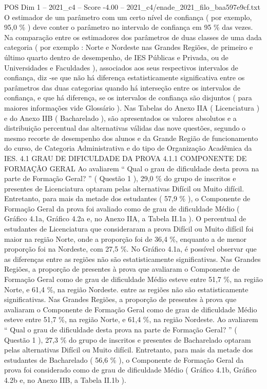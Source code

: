 \begin{textsample}{POS Dim 1 – 2021\_c4 – Score -4.00 – 2021\_c4/enade\_2021\_filo\_baa597e9cf.txt}
O estimador de um parâmetro com um certo nível de confiança ( por exemplo, 95,0 \% ) deve conter o parâmetro no intervalo de confiança em 95 \% das vezes.
Na comparação entre os estimadores dos parâmetros de duas classes de uma dada categoria ( por exemplo : Norte e Nordeste nas Grandes Regiões, de primeiro e último quarto dentro de desempenho, de IES Públicas e Privada, ou de Universidades e Faculdades ), associados aos seus respectivos intervalos de confiança, diz -se que não há diferença estatisticamente significativa entre os parâmetros das duas categorias quando há interseção entre os intervalos de confiança, e que há diferença, se os intervalos de confiança são disjuntos ( para maiores informações vide Glossário ).
Nas Tabelas do Anexo IIA ( Licenciatura ) e do Anexo IIB ( Bacharelado ), são apresentados os valores absolutos e a distribuição percentual das alternativas válidas das nove questões, segundo o mesmo recorte de desempenho dos alunos e da Grande Região de funcionamento do curso, de Categoria Administrativa e do tipo de Organização Acadêmica da IES. 4.1 GRAU DE DIFICULDADE DA PROVA 4.1.1 COMPONENTE DE FORMAÇÃO GERAL Ao avaliarem “ Qual o grau de dificuldade desta prova na parte de Formação Geral? ” ( Questão 1 ), 29,0 \% do grupo de inscritos e presentes de Licenciatura optaram pelas alternativas Difícil ou Muito difícil.
Entretanto, para mais da metade dos estudantes ( 57,9 \% ), o Componente de Formação Geral da prova foi avaliado como de grau de dificuldade Médio ( Gráfico 4.1a, Gráfico 4.2a e, no Anexo IIA, a Tabela II.1a ).
O percentual de estudantes de Licenciatura que consideraram a prova Difícil ou Muito difícil foi maior na região Norte, onde a proporção foi de 36,4 \%, enquanto a de menor proporção foi na Nordeste, com 27,5 \%.
No Gráfico 4.1a, é possível observar que as diferenças entre as regiões não são estatisticamente significativas.
Nas Grandes Regiões, a proporção de presentes à prova que avaliaram o Componente de Formação Geral como de grau de dificuldade Médio esteve entre 51,7 \%, na região Norte, e 61,4 \%, na região Nordeste. entre as regiões não são estatisticamente significativas.
Nas Grandes Regiões, a proporção de presentes à prova que avaliaram o Componente de Formação Geral como de grau de dificuldade Médio esteve entre 51,7 \%, na região Norte, e 61,4 \%, na região Nordeste.
Ao avaliarem “ Qual o grau de dificuldade desta prova na parte de Formação Geral? ” ( Questão 1 ), 27,3 \% do grupo de inscritos e presentes de Bacharelado optaram pelas alternativas Difícil ou Muito difícil.
Entretanto, para mais da metade dos estudantes de Bacharelado ( 56,6 \% ), o Componente de Formação Geral da prova foi considerado como de grau de dificuldade Médio ( Gráfico 4.1b, Gráfico 4.2b e, no Anexo IIB, a Tabela II.1b ).

\end{textsample}
